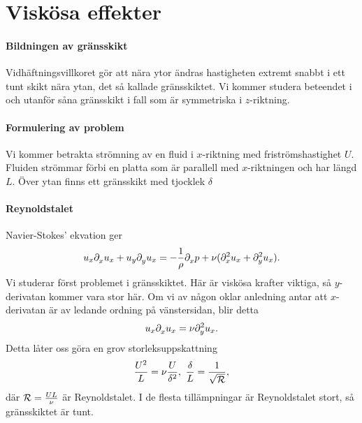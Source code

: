 \section{Viskösa effekter}

\paragraph{Bildningen av gränsskikt}
Vidhäftningsvillkoret gör att nära ytor ändras hastigheten extremt snabbt i ett tunt skikt nära ytan, det så kallade gränsskiktet. Vi kommer studera beteendet i och utanför såna gränsskikt i fall som är symmetriska i $z$-riktning.

\paragraph{Formulering av problem}
Vi kommer betrakta strömning av en fluid i $x$-riktning med friströmshastighet $U$. Fluiden strömmar förbi en platta som är parallell med $x$-riktningen och har längd $L$. Över ytan finns ett gränsskikt med tjocklek $\delta$

\paragraph{Reynoldstalet}
Navier-Stokes' ekvation ger
\begin{align*}
	u_{x}\del{x}{u_{x}} + u_{y}\del{y}{u_{x}} = -\frac{1}{\rho}\del{x}{p} + \nu(\del[2]{x}{u_{x}} + \del[2]{y}{u_{x}}).
\end{align*}
Vi studerar först problemet i gränsskiktet. Här är viskösa krafter viktiga, så $y$-derivatan kommer vara stor här. Om vi av någon oklar anledning antar att $x$-derivatan är av ledande ordning på vänstersidan, blir detta
\begin{align*}
	u_{x}\del{x}{u_{x}} = \nu\del[2]{y}{u_{x}}.
\end{align*}
Detta låter oss göra en grov storleksuppskattning
\begin{align*}
	\frac{U^{2}}{L} = \nu\frac{U}{\delta^{2}},\ \frac{\delta}{L} = \frac{1}{\sqrt{\rey}},
\end{align*}
där $\rey = \frac{UL}{\nu}$ är Reynoldstalet. I de flesta tillämpningar är Reynoldstalet stort, så gränsskiktet är tunt.

